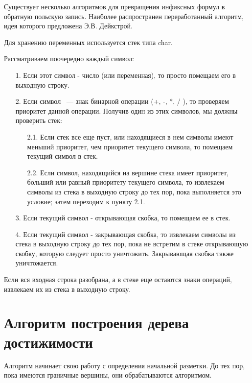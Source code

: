 Существует несколько алгоритмов для превращения инфиксных формул в обратную польскую запись. Наиболее распространен переработанный алгоритм, идея которого предложена Э.В. Дейкстрой.

Для хранению переменных используется стек типа char.

Рассматриваем поочередно каждый символ:
\begin{enumerate}
\item[1.] Если этот символ - число (или переменная), то просто помещаем его в выходную строку.
\item[2.] Если символ ~--- знак бинарной операции (+, -, *, / ), то проверяем приоритет данной операции. Получив один из этих символов, мы должны проверить стек:
\begin{enumerate}
\item[2.1.] Если стек все еще пуст, или находящиеся в нем символы имеют меньший приоритет, чем приоритет текущего символа, то помещаем текущий символ в стек.
\item[2.2.] Если символ, находящийся на вершине стека имеет приоритет, больший или равный приоритету текущего символа, то извлекаем символы из стека в выходную строку до тех пор, пока выполняется это условие; затем переходим к пункту 2.1.
\end{enumerate}
\item[3.] Если текущий символ - открывающая скобка, то помещаем ее в стек.
\item[4.] Если текущий символ - закрывающая скобка, то извлекаем символы из стека в выходную строку до тех пор, пока не встретим в стеке открывающую скобку, которую следует просто уничтожить. Закрывающая скобка также уничтожается.
\end{enumerate}

Если вся входная строка разобрана, а в стеке еще остаются знаки операций, извлекаем их из стека в выходную строку.

\section{Алгоритм построения дерева достижимости}

Алгоритм начинает свою работу с определения начальной разметки. До тех пор, пока имеются граничные вершины, они обрабатываются алгоритмом.

